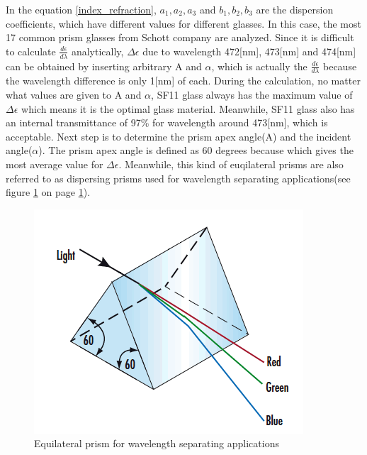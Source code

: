 In the equation \ref{index_refraction}, $a_{1}, a_{2}, a_{3}$ and $b_{1}, b_{2}, b_{3}$ are the dispersion coefficients, which have different values for different glasses. In this case, the most 17 common prism glasses from Schott\cite{prism_material}\cite{prism_book} company are analyzed. Since it is difficult to calculate $\frac{d\epsilon}{d\lambda}$ analytically, $\Delta\epsilon$ due to wavelength 472[nm], 473[nm] and 474[nm] can be obtained by inserting arbitrary A and $\alpha$, which is actually the $\frac{d\epsilon}{d\lambda}$ because the wavelength difference is only 1[nm] of each. During the calculation, no matter what values are given to A and $\alpha$, SF11 glass always has the maximum value of $\Delta\epsilon$ which means it is the optimal glass material. Meanwhile, SF11 glass also has an internal transmittance of 97\% for wavelength around 473[nm], which is acceptable. Next step is to determine the prism apex angle(A) and the incident angle($\alpha$). The prism apex angle is defined as 60 degrees because which gives the most average value for $\Delta\epsilon$. Meanwhile, this kind of euqilateral prisms are also referred to as dispersing prisms used for wavelength separating applications(see figure \ref{fig:prism_equilateral} on page \ref{fig:prism_equilateral}). 

\begin{figure}[ht!]
\centering
\includegraphics[scale = 0.8]{chapters/img/prism_equilateral.png}
\caption{Equilateral prism for wavelength separating applications}
\label{fig:prism_equilateral}
\end{figure}

